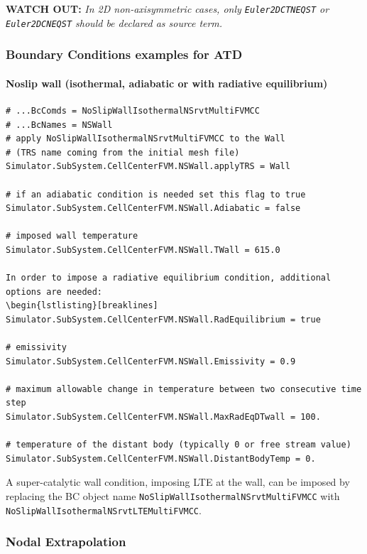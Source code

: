 \documentclass[11pt]{article}
\begin{document}
{\bf WATCH OUT:} {\it In 2D non-axisymmetric cases, only {\tt Euler2DCTNEQST} or {\tt Euler2DCNEQST} should be declared as source term.}

\subsubsection{Boundary Conditions examples for ATD}

\paragraph{Noslip wall (isothermal, adiabatic or with radiative equilibrium)}

\begin{lstlisting}[breaklines]
# ...BcComds = NoSlipWallIsothermalNSrvtMultiFVMCC
# ...BcNames = NSWall
# apply NoSlipWallIsothermalNSrvtMultiFVMCC to the Wall
# (TRS name coming from the initial mesh file)
Simulator.SubSystem.CellCenterFVM.NSWall.applyTRS = Wall

# if an adiabatic condition is needed set this flag to true
Simulator.SubSystem.CellCenterFVM.NSWall.Adiabatic = false

# imposed wall temperature
Simulator.SubSystem.CellCenterFVM.NSWall.TWall = 615.0

In order to impose a radiative equilibrium condition, additional options are needed:
\begin{lstlisting}[breaklines]
Simulator.SubSystem.CellCenterFVM.NSWall.RadEquilibrium = true

# emissivity
Simulator.SubSystem.CellCenterFVM.NSWall.Emissivity = 0.9

# maximum allowable change in temperature between two consecutive time step
Simulator.SubSystem.CellCenterFVM.NSWall.MaxRadEqDTwall = 100.

# temperature of the distant body (typically 0 or free stream value)
Simulator.SubSystem.CellCenterFVM.NSWall.DistantBodyTemp = 0.
\end{lstlisting}

A super-catalytic wall condition, imposing LTE at the wall, can be imposed by replacing 
the BC object name {\tt NoSlipWallIsothermalNSrvtMultiFVMCC} with 
{\tt NoSlipWallIsothermalNSrvtLTEMultiFVMCC}. 

\subsubsection{Nodal Extrapolation}
\end{document}
